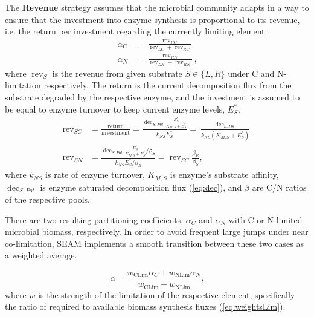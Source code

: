 The \textbf{Revenue} strategy assumes that the microbial community adapts in a
way to ensure that the investment into enzyme synthesis is proportional to its
revenue, i.e.
the return per investment regarding the currently
limiting element:
\begin{subequations}
\label{eq:allocRev}
\begin{align}
\alpha_C &= \frac{\operatorname{rev}_{RC}}{\operatorname{rev}_{LC} + \operatorname{rev}_{RC}} 
\\
\alpha_N &= \frac{\operatorname{rev}_{RN}}{\operatorname{rev}_{LN} + \operatorname{rev}_{RN}} 
\text{,} 
\end{align}
\end{subequations}
where $\operatorname{rev}_S$ is the revenue from given substrate $S \in \{L,R\}$
under C and N-limitation respectively. The return is the current decomposition
flux from the substrate degraded by the respective enzyme, and the investment is
assumed to be equal to enzyme turnover to keep current enzyme levels, $E_S^*$.
\begin{subequations}
\label{eq:allocRev2}
\begin{align}
\operatorname{rev}_{SC} &= \frac{\text{return}}{\text{investment}} 
= \frac{\operatorname{dec}_{S,Pot} \frac{E_S^*}{K_{M,S} + E_S^*}} {k_{NS}E_S^*} 
= \frac{\operatorname{dec}_{S,Pot}} {k_{NS}(K_{M,S} + E_S^*)} 
\\ 
\operatorname{rev}_{SN} &= \frac{\operatorname{dec}_{S,Pot}
\frac{E_S^*}{K_{M,S} + E_S^*} / \beta_S} {k_{NS} E_S^* / \beta_E} 
= \operatorname{rev}_{SC} \frac{\beta_E}{\beta_S}
\text{,} 
\end{align}
\end{subequations}
where $k_{NS}$ is rate of enzyme turnover, $K_{M,S}$ is enzyme's substrate
affinity, $\operatorname{dec}_{S,Pot}$ is
enzyme saturated decomposition flux (\ref{eq:dec}), and $\beta$ are C/N ratios
of the respective pools.

There are two resulting partitioning coefficients, $\alpha_C$ and $\alpha_N$
with C or N-limited microbial biomass, respectively. In order to avoid frequent large jumps
under near co-limitation, SEAM implements a smooth transition between these two
cases as a weighted average.

\begin{equation}
\label{eq:allocRev3}
\alpha = \frac{w_{\operatorname{CLim}} \alpha_C + w_{\operatorname{NLim}}
\alpha_N}{w_{\operatorname{CLim}}  + w_{\operatorname{NLim}} } 
\text{,} 
\end{equation}
where $w$ is the strength of the limitation of the respective element,
specifically the ratio of required to available biomass synthesis fluxes
(\ref{eq:weightsLim}).


